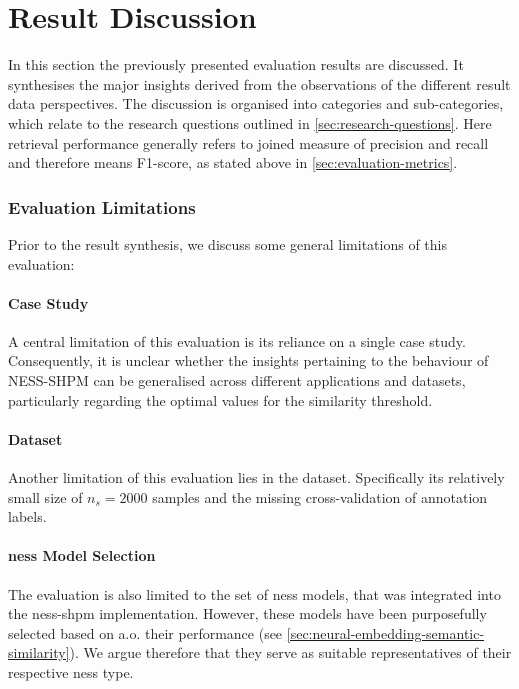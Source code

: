 \documentclass[11pt, numbers=noenddot]{scrreprt}
\begin{document}
\newpage
\section{Result Discussion}
\label{sec:result-discussion}
In this section the previously presented evaluation results are discussed. It synthesises the major insights derived from the observations of the different result data perspectives. The discussion is organised into categories and sub-categories, which relate to the research questions outlined in \cref{sec:research-questions}. Here retrieval performance generally refers to joined measure of precision and recall and therefore means F1-score, as stated above in \cref{sec:evaluation-metrics}. 

\subsubsection{Evaluation Limitations} 
Prior to the result synthesis, we discuss some general limitations of this evaluation:

\paragraph{Case Study} A central limitation of this evaluation is its reliance on a single case study. Consequently, it is unclear whether the insights pertaining to the behaviour of NESS-SHPM can be generalised across different applications and datasets, particularly regarding the optimal values for the similarity threshold.

\paragraph{Dataset} Another limitation of this evaluation lies in the dataset. Specifically its relatively small size of \(n_s = 2000\) samples and the missing cross-validation of annotation labels.

\paragraph{\gls{ness} Model Selection} The evaluation is also limited to the set of \gls{ness} models, that was integrated into the \gls{ness-shpm} implementation. However, these models have been purposefully selected based on a.o. their performance (see \cref{sec:neural-embedding-semantic-similarity}). We argue therefore that they serve as suitable representatives of their respective \gls{ness} type.
\end{document}
